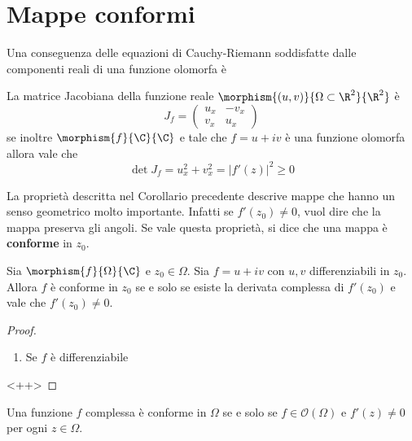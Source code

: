 \chapter{Mappe conformi}

Una conseguenza delle equazioni di Cauchy-Riemann soddisfatte dalle componenti
reali di una funzione olomorfa è 

\begin{corollary}
  La matrice Jacobiana della funzione reale $\morphism{(u,v)}{\Omega \subset
  \R^2}{\R^2}$ è
  \begin{equation*}
    J_f = \left(\begin{array}{cc} 
        u_x & -v_x\\
        v_x & u_x
    \end{array}\right) 
  \end{equation*}
  se inoltre $\morphism{f}{\C}{\C}$ e tale che $f = u + iv$ è una funzione
  olomorfa allora vale che
  \begin{equation*}
    \det J_f = u^2_x + v^2_x = |f'(z)|^2 \ge 0 
  \end{equation*}
\end{corollary}

\begin{remark}
  La proprietà descritta nel Corollario precedente descrive mappe che hanno un 
  senso geometrico molto importante. Infatti se $f'(z_0) \neq 0$, vuol dire che
  la mappa preserva gli angoli. Se vale questa proprietà, si dice che una mappa
  è \textbf{conforme} in $z_0$.
  \label{rmk:conforme_intuizione}
\end{remark}

\begin{theorem}
  Sia $\morphism{f}{\Omega}{\C}$ e $z_0 \in \Omega$. Sia $f = u + iv$ con $u,v$
  differenziabili in $z_0$. Allora $f$ è conforme in $z_0$ se e solo se esiste
  la derivata complessa di $f'(z_0)$ e vale che $f'(z_0) \neq 0$.
  \label{<+label+>}
\end{theorem}
\begin{proof}\
  \begin{enumerate}
    \item Se $f$ è differenziabile
  \end{enumerate}<++>
\end{proof}

\begin{corollary}
  Una funzione $f$ complessa è conforme in $\Omega$ se e solo se $f \in
  \mathcal{O}(\Omega)$ e $f'(z) \neq 0$ per ogni $z \in \Omega$. 
  \label{cor:estensione_teorema_conformita}
\end{corollary}

